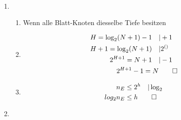 \documentclass[]{book}
\theoremstyle{definition}
\begin{document}
\begin{enumerate}
    \item \begin{enumerate}
        \item Wenn alle Blatt-Knoten diesselbe Tiefe besitzen
        \item \begin{align*}
            H  = \log_2(N + 1) - 1 \quad &|+ 1\\ 
            H + 1 = \log_2(N + 1)  \quad &|2^{()}\\ 
            2^{H + 1}  = N + 1 \quad &|-1\\ 
            2^{H + 1} - 1  = N &\qed
        \end{align*}
        \item \begin{align*}
            n_E & \le 2^h \quad |\log_2\\ 
            log_2 n_E & \le h \qed
        \end{align*}
    \end{enumerate}
    \item 

    
\end{enumerate}
\end{document}
